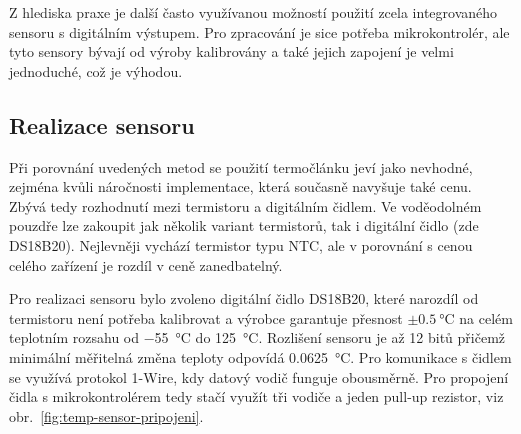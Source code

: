         Z hlediska praxe je další často využívanou možností použití zcela integrovaného sensoru s digitálním výstupem. Pro zpracování je sice potřeba mikrokontrolér, ale tyto sensory bývají od výroby kalibrovány a také jejich zapojení je velmi jednoduché, což je výhodou.

    \subsection{Realizace sensoru}
        Při porovnání uvedených metod se použití termočlánku jeví jako nevhodné, zejména kvůli náročnosti implementace, která současně navyšuje také cenu. Zbývá tedy rozhodnutí mezi termistoru a digitálním čidlem. Ve voděodolném pouzdře lze zakoupit jak několik variant termistorů, tak i digitální čidlo (zde DS18B20). Nejlevněji vychází termistor typu NTC, ale v porovnání s cenou celého zařízení je rozdíl v ceně zanedbatelný. 
        
        Pro realizaci sensoru bylo zvoleno digitální čidlo DS18B20, které narozdíl od termistoru není potřeba kalibrovat a výrobce garantuje přesnost \(\pm \qty{0.5}{\degreeCelsius}\) na celém teplotním rozsahu od \qty{-55}{\degreeCelsius} do \qty{+125}{\degreeCelsius}. Rozlišení sensoru je až 12 bitů přičemž minimální měřitelná změna teploty odpovídá \qty{0.0625}{\degreeCelsius}. Pro komunikace s čidlem se využívá protokol 1-Wire, kdy datový vodič funguje obousměrně. Pro propojení čidla s mikrokontrolérem tedy stačí využít tři vodiče a jeden pull-up rezistor, viz obr.~\ref{fig:temp-sensor-pripojeni}.


